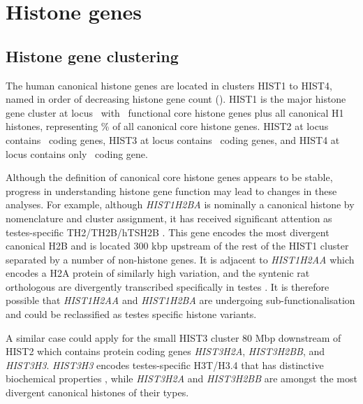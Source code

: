 \section{Histone genes}

  \subsection{Histone gene clustering}
    The human canonical histone genes are located in clusters HIST1 to HIST4,
    named in order of decreasing histone gene count ().
    HIST1 is the major histone gene cluster at locus~\HISTOneLocus{}
    with \CodingGenesInHISTOne{}~functional core histone genes plus all canonical H1 histones,
    representing
     \result{}\%
    of all canonical core histone genes.
    HIST2 at locus \HISTTwoLocus{} contains \CodingGenesInHISTTwo{}~coding genes,
    HIST3 at locus \HISTThreeLocus{} contains \CodingGenesInHISTThree{}~coding genes,
    and HIST4 at locus \HISTFourLocus{} contains only \CodingGenesInHISTFour{}~coding gene.

    Although the definition of canonical core histone genes appears to be stable,
    progress in understanding histone gene function may lead to changes in these analyses.
    For example, although \textit{HIST1H2BA} is nominally a canonical histone
    by nomenclature and cluster assignment,
    it has received significant attention as testes-specific TH2/TH2B/hTSH2B
    \citep{Zalensky2002,LiAusio2005,Shinagawa2014}.
    This gene encodes the most divergent canonical H2B
    and is located 300 kbp upstream of the rest of the HIST1 cluster
    separated by a number of non-histone genes.
    It is adjacent to \textit{HIST1H2AA} which encodes a H2A protein
    of similarly high variation,
    and the syntenic rat orthologous are divergently transcribed
    specifically in testes \citep{HuhChae1991}.
    It is therefore possible that \textit{HIST1H2AA} and \textit{HIST1H2BA}
    are undergoing sub-functionalisation and could be reclassified
    as testes specific histone variants.

    \label{sec:hist3h3}
    A similar case could apply for the small HIST3 cluster 80 Mbp downstream of HIST2
    which contains protein coding genes \textit{HIST3H2A}, \textit{HIST3H2BB},
    and \textit{HIST3H3}.
    \textit{HIST3H3} encodes testes-specific H3T/H3.4
    that has distinctive biochemical properties \citep{WittExpCellRes1996,KurumizakaCOSB2013},
    while \textit{HIST3H2A} and \textit{HIST3H2BB} are amongst
    the most divergent canonical histones of their types.

